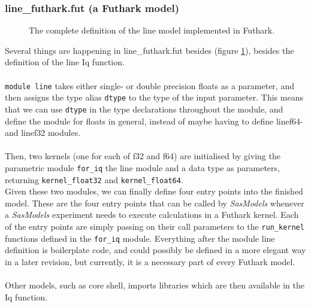 \documentclass[11pt]{article}
\newcommand{\sasmodels}{\textit{SasModels}}
\begin{document}
\subsubsection{line\_futhark.fut (a Futhark model)}
\label{sec:line-fut}

\begin{figure}
  
  \caption{The complete definition of the line model implemented in Futhark.}
  \label{fig:linemodel-futhark-full}
\end{figure}

Several things are happening in line\_futhark.fut besides (figure
\ref{fig:linemodel-futhark-full}), besides the definition of the line Iq function.
\\
\\
\texttt{module line} takes either single- or double precision floats as a
parameter, and then assigns the type alias \texttt{dtype} to the type of the
input parameter. This means that we can use \texttt{dtype} in the type
declarations throughout the module, and define the module for floats in general,
instead of maybe having to define linef64- and linef32 modules.
\\\\
Then, two kernels (one for each of f32 and f64) are initialised by giving
the parametric module \texttt{for\_iq} the line module and a data type 
as parameters, returning \texttt{kernel\_float32} and \texttt{kernel\_float64}.
\\
Given these two modules, we can finally define four entry points into the
finished model. These are the four entry points that can be called by 
\sasmodels{} whenever a \sasmodels{} experiment needs to execute calculations 
in a Futhark kernel.
Each of the entry points are simply passing on their call parameters to the 
\texttt{run\_kernel} functions defined in the \texttt{for\_iq} module.
Everything after the module line definition is boilerplate code, and could
possibly be defined in a more elegant way in a later revision, but currently, it 
is a necessary part of every Futhark model.
\\\\
Other models, such as core shell, imports libraries which are then
available in the Iq function.
\end{document}
